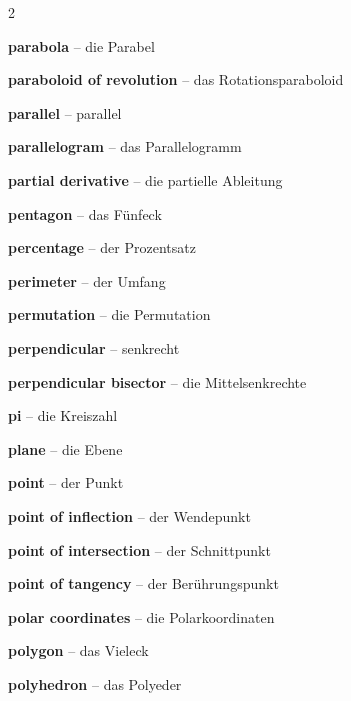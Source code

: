 \begin{multicols}{2}
\par\nopagebreak
\textbf{parabola} -- die Parabel\dotfill\hyperref[e:125]{\pageref*{e:125}}\par
\textbf{paraboloid of revolution} -- das Rotationsparaboloid\dotfill\hyperref[e:243]{\pageref*{e:243}}\par
\textbf{parallel} -- parallel\dotfill\hyperref[e:150]{\pageref*{e:150}}\par
\textbf{parallelogram} -- das Parallelogramm\dotfill\hyperref[e:200]{\pageref*{e:200}}\par
\textbf{partial derivative} -- die partielle Ableitung\dotfill\hyperref[e:277]{\pageref*{e:277}}\par
\textbf{pentagon} -- das Fünfeck\dotfill\hyperref[e:206]{\pageref*{e:206}}\par
\textbf{percentage} -- der Prozentsatz\dotfill\hyperref[e:58]{\pageref*{e:58}}\par
\textbf{perimeter} -- der Umfang\dotfill\hyperref[e:209]{\pageref*{e:209}}\par
\textbf{permutation} -- die Permutation\dotfill\hyperref[e:341]{\pageref*{e:341}}\par
\textbf{perpendicular} -- senkrecht\dotfill\hyperref[e:151]{\pageref*{e:151}}\par
\textbf{perpendicular bisector} -- die Mittelsenkrechte\dotfill\hyperref[e:170]{\pageref*{e:170}}\par
\textbf{pi} -- die Kreiszahl\dotfill\hyperref[e:216]{\pageref*{e:216}}\par
\textbf{plane} -- die Ebene\dotfill\hyperref[e:308]{\pageref*{e:308}}\par
\textbf{point} -- der Punkt\dotfill\hyperref[e:146]{\pageref*{e:146}}\par
\textbf{point of inflection} -- der Wendepunkt\dotfill\hyperref[e:284]{\pageref*{e:284}}\par
\textbf{point of intersection} -- der Schnittpunkt\dotfill\hyperref[e:123]{\pageref*{e:123}}\par
\textbf{point of tangency} -- der Berührungspunkt\dotfill\hyperref[e:220]{\pageref*{e:220}}\par
\textbf{polar coordinates} -- die Polarkoordinaten\dotfill\hyperref[e:311]{\pageref*{e:311}}\par
\textbf{polygon} -- das Vieleck\dotfill\hyperref[e:204]{\pageref*{e:204}}\par
\textbf{polyhedron} -- das Polyeder\dotfill\hyperref[e:233]{\pageref*{e:233}}\par

\end{multicols}
